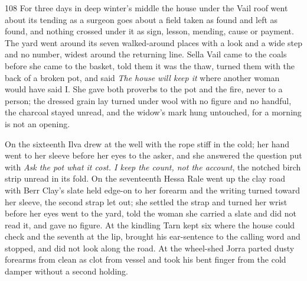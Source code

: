 
\scenebreak


\scenebreak


\scenebreak

\CRtailpiece
\begin{CRchronicle}{108}
For three days in deep winter’s middle the house under the Vail roof went about its tending as a surgeon goes about a field taken as found and left as found, and nothing crossed under it as sign, lesson, mending, cause or payment. The yard went around its seven walked-around places with a look and a wide step and no number, widest around the returning line. Sella Vail came to the coals before she came to the basket, told them it was the thaw, turned them with the back of a broken pot, and said \emph{The house will keep it} where another woman would have said I. She gave both proverbs to the pot and the fire, never to a person; the dressed grain lay turned under wool with no figure and no handful, the charcoal stayed unread, and the widow’s mark hung untouched, for a morning is not an opening.

On the sixteenth Ilva drew at the well with the rope stiff in the cold; her hand went to her sleeve before her eyes to the asker, and she answered the question put with \emph{Ask the pot what it cost. I keep the count, not the account}, the notched birch strip unread in its fold. On the seventeenth Hessa Rale went up the clay road with Berr Clay’s slate held edge-on to her forearm and the writing turned toward her sleeve, the second strap let out; she settled the strap and turned her wrist before her eyes went to the yard, told the woman she carried a slate and did not read it, and gave no figure. At the kindling Tarn kept six where the house could check and the seventh at the lip, brought his ear-sentence to the calling word and stopped, and did not look along the road. At the wheel-shed Jorra parted dusty forearms from clean as clot from vessel and took his bent finger from the cold damper without a second holding.


\end{CRchronicle}
